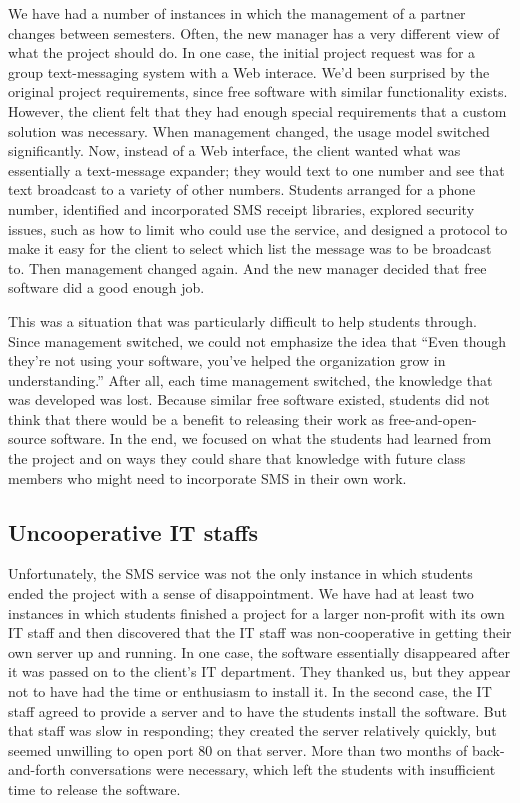 We have had a number of instances in which the management of a
partner changes between semesters.  Often, the new manager has a
very different view of what the project should do.  In one case,
the initial project request was for a group text-messaging system
with a Web interace.  We'd been surprised by the original project
requirements, since free software with similar functionality exists.
However, the client felt that they had enough special requirements
that a custom solution was necessary.  When management changed, the
usage model switched significantly.  Now, instead of a Web interface,
the client wanted what was essentially a text-message expander;
they would text to one number and see that text broadcast to a
variety of other numbers.  Students arranged for a phone number,
identified and incorporated SMS receipt libraries, explored security
issues, such as how to limit who could use the service, and designed
a protocol to make it easy for the client to select which list the
message was to be broadcast to.  Then management changed again.  And
the new manager decided that free software did a good enough job.

This was a situation that was particularly difficult to help students
through.  Since management switched, we could not emphasize the idea
that ``Even though they're not using your software, you've helped the
organization grow in understanding.'' After all, each time management 
switched, the knowledge that was developed was lost.   Because similar
free software existed, students did not think that there would be
a benefit to releasing their work as free-and-open-source software.
In the end, we focused on what the students had learned from the project
and on ways they could share that knowledge with future class members
who might need to incorporate SMS in their own work.

\subsection{Uncooperative IT staffs}

Unfortunately, the SMS service was not the only instance in which
students ended the project with a sense of disappointment.  We have
had at least two instances in which students finished a project for
a larger non-profit with its own IT staff and then discovered that
the IT staff was non-cooperative in getting their own server up and
running.  In one case, the software essentially disappeared after
it was passed on to the client's IT department.  They thanked us,
but they appear not to have had the time or enthusiasm to install
it.  In the second case, the IT staff agreed to provide a server
and to have the students install the software.  But that staff was
slow in responding; they created the server relatively quickly, but
seemed unwilling to open port 80 on that server.  More than two
months of back-and-forth conversations were necessary, which left
the students with insufficient time to release the software.


